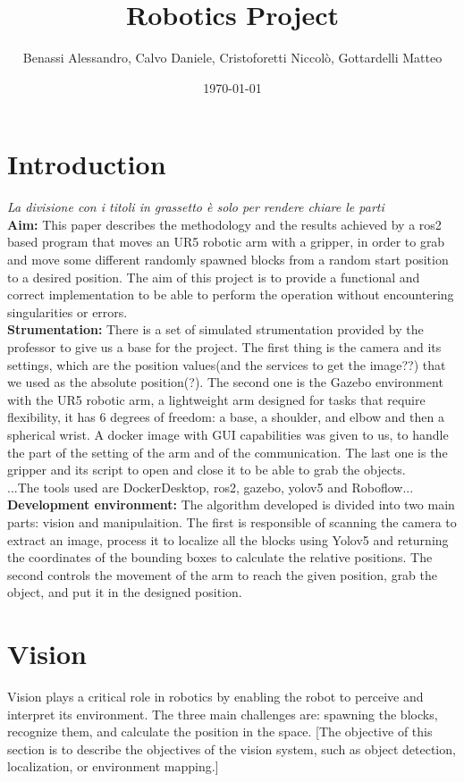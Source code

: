 \documentclass[12pt,a4paper]{article}
\title{Robotics Project}
\author{Benassi Alessandro, Calvo Daniele, Cristoforetti Niccolò, Gottardelli Matteo}
\date{\today}
\begin{document}
\maketitle
\tableofcontents
\newpage

\section{Introduction}\label{sec:intro}
\textit{La divisione con i titoli in grassetto è solo per rendere chiare le parti}\\
\textbf{Aim:} This paper describes the methodology and the results achieved by a ros2 based program that moves an UR5 robotic arm with a gripper, in order to grab and move some different randomly spawned blocks from a random start position to a desired position. The aim of this project is to provide a functional and correct implementation to be able to perform the operation without encountering singularities or errors.\\
\textbf{Strumentation:} There is a set of simulated strumentation provided by the professor to give us a base for the project. The first thing is the camera and its settings, which are the position values(and the services to get the image??) that we used as the absolute position(?). The second one is the Gazebo environment with the UR5 robotic arm, a lightweight arm designed for tasks that require flexibility, it has 6 degrees of freedom: a base, a shoulder, and elbow and then a spherical wrist. A docker image with GUI capabilities was given to us, to handle the part of the setting of the arm and of the communication. The last one is the gripper and its script to open and close it to be able to grab the objects.\\
...The tools used are DockerDesktop, ros2, gazebo, yolov5 and Roboflow...\\
\textbf{Development environment:} The algorithm developed is divided into two main parts: vision and manipulaition. The first is responsible of scanning the camera to extract an image, process it to localize all the blocks using Yolov5 and returning the coordinates of the bounding boxes to calculate the relative positions. The second controls the movement of the arm to reach the given position, grab the object, and put it in the designed position.


\section{Vision}\label{sec:vision}
Vision plays a critical role in robotics by enabling the robot to perceive and interpret its environment. 
The three main challenges are: spawning the blocks, recognize them, and calculate the position in the space. 
[The objective of this section is to describe the objectives of the vision system, such as object detection, localization, or environment mapping.]
\end{document}
